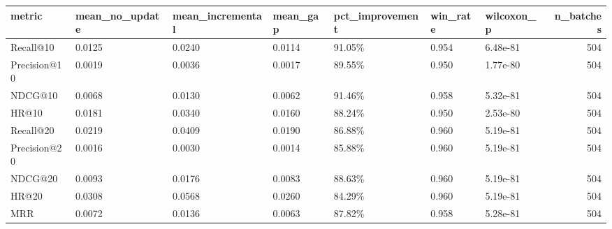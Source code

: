 \begin{tabular}{lllllllr}
\toprule
metric & mean_no_update & mean_incremental & mean_gap & pct_improvement & win_rate & wilcoxon_p & n_batches \\
\midrule
Recall@10 & 0.0125 & 0.0240 & 0.0114 & 91.05\% & 0.954 & 6.48e-81 & 504 \\
Precision@10 & 0.0019 & 0.0036 & 0.0017 & 89.55\% & 0.950 & 1.77e-80 & 504 \\
NDCG@10 & 0.0068 & 0.0130 & 0.0062 & 91.46\% & 0.958 & 5.32e-81 & 504 \\
HR@10 & 0.0181 & 0.0340 & 0.0160 & 88.24\% & 0.950 & 2.53e-80 & 504 \\
Recall@20 & 0.0219 & 0.0409 & 0.0190 & 86.88\% & 0.960 & 5.19e-81 & 504 \\
Precision@20 & 0.0016 & 0.0030 & 0.0014 & 85.88\% & 0.960 & 5.19e-81 & 504 \\
NDCG@20 & 0.0093 & 0.0176 & 0.0083 & 88.63\% & 0.960 & 5.19e-81 & 504 \\
HR@20 & 0.0308 & 0.0568 & 0.0260 & 84.29\% & 0.960 & 5.19e-81 & 504 \\
MRR & 0.0072 & 0.0136 & 0.0063 & 87.82\% & 0.958 & 5.28e-81 & 504 \\
\bottomrule
\end{tabular}
